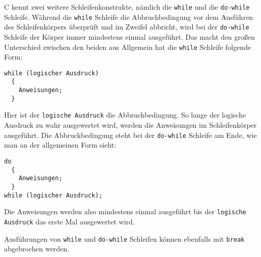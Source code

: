 C kennt zwei weitere Schleifenkonstrukte, nämlich die \verb|while| und die \verb|do-while| Schleife.
Während die \verb|while| Schleife die Abbruchbedingung vor dem Ausführen des Schleifenkörpers überprüft und im Zweifel abbricht, wird bei der \verb|do-while| Schleife der Körper immer mindestens einmal ausgeführt.
Das macht den großen Unterschied zwischen den beiden aus
Allgemein hat die \verb|while| Schleife folgende Form:
\begin{lstlisting}
while (logischer Ausdruck)
  {
    Anweisungen;
  }
\end{lstlisting}
Hier ist der \texttt{logische Ausdruck} die Abbruchbedingung.
So lange der logische Ausdruck zu wahr ausgewertet wird, werden die Anweisungen im Schleifenkörper ausgeführt.
Die Abbruckbedingung steht bei der \verb|do-while| Schleife am Ende, wie man an der allgemeinen Form sieht:
\begin{lstlisting}
do
  {
    Anweisungen;
  }
while (logischer Ausdruck);
\end{lstlisting}
Die Anweisungen werden also mindestens einmal ausgeführt bis der \texttt{logische Ausdruck} das erste Mal ausgewertet wird.

Ausführungen von \verb|while| und \verb|do-while| Schleifen können ebenfalls mit \verb|break| abgebrochen werden.
\endinput

